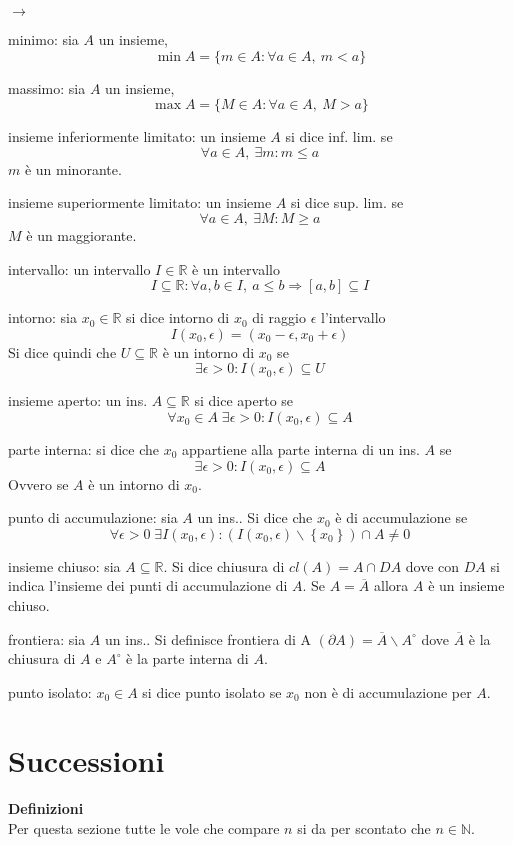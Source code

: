 \documentclass[12pt,a4paper]{article}
\newcommand*{\ep}{\epsilon}
\begin{document}
\begin{list}{$\rightarrow$}{}
    \item minimo: sia $A$ un insieme, \[\min A = \{m \in A : \forall a \in A,\: m < a\}\] 
    \item massimo: sia $A$ un insieme, \[\max A = \{M \in A : \forall a \in A,\: M > a\}\]
    \item insieme inferiormente limitato: un insieme $A$ si dice inf. lim. se \[\forall a \in A, \: \exists m : m \le a\] $m$ è un minorante.
    \item insieme superiormente limitato: un insieme $A$ si dice sup. lim. se \[\forall a \in A, \: \exists M : M \ge a\] $M$ è un maggiorante.
    \item intervallo: un intervallo $I \in \mathbb{R}$ è un intervallo \[I \subseteq \mathbb{R} : \forall a, b \in I, \: a \le b \Rightarrow \left[a, b\right] \subseteq I\]
    \item intorno: sia $x_0 \in \mathbb{R}$ si dice intorno di $x_0$ di raggio $\ep$ l'intervallo \[I(x_0, \ep) = (x_0 - \ep, x_0 + \ep)\] Si dice quindi che $U \subseteq \mathbb{R}$ è un intorno di $x_0$ se \[\exists \ep > 0 : I(x_0, \ep) \subseteq U\] 
    \item insieme aperto: un ins. $A \subseteq \mathbb{R}$ si dice aperto se \[\forall x_0 \in A \; \exists \ep > 0 : I(x_0, \ep) \subseteq A\] 
    \item parte interna: si dice che $x_0$ appartiene alla parte interna di un ins. $A$ se \[\exists \ep > 0 : I(x_0, \ep) \subseteq A\] Ovvero se $A$ è un intorno di $x_0$.
    \item punto di accumulazione: sia $A$ un ins.. Si dice che $x_0$ è di accumulazione se \[\forall \ep > 0 \; \exists I(x_0, \ep) : (I(x_0, \ep)\smallsetminus \left\{x_0\right\}) \cap A \neq 0\]
    \item insieme chiuso: sia $A \subseteq \mathbb{R}$. Si dice chiusura di $cl(A) = A \cap DA$ dove con $DA$ si indica l'insieme dei punti di accumulazione di $A$. Se $A = \overline{A}$ allora $A$ è un insieme chiuso.
    \item frontiera: sia $A$ un ins.. Si definisce frontiera di A $(\partial A) = \overline{A} \smallsetminus A^{\circ} $ dove $\overline{A}$ è la chiusura di $A$ e $A^{\circ}$ è la parte interna di $A$.
    \item punto isolato: $x_0 \in A$ si dice punto isolato se $x_0$ non è di accumulazione per $A$.
\end{list}

\section*{Successioni}
\textbf{Definizioni\\}
Per questa sezione tutte le vole che compare $n$ si da per scontato che $n \in \mathbb{N}$.
\end{document}
